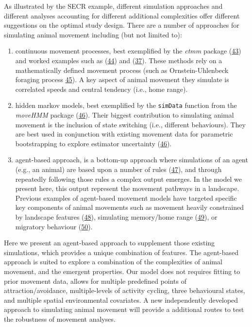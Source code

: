 \documentclass[10pt,a4paper]{article}
\begin{document}
As illustrated by the SECR example, different simulation approaches and different analyses accounting for different additional complexities offer different suggestions on the optimal study design.
There are a number of approaches for simulating animal movement including (but not limited to):

\begin{enumerate}
\def\labelenumi{\arabic{enumi}.}
\item
  continuous movement processes, best exemplified by the \emph{ctmm} package (\protect\hyperlink{ref-Calabrese2016}{43}) and worked examples such as (\protect\hyperlink{ref-silva_autocorrelationinformed_2022}{44}) and (\protect\hyperlink{ref-theng_confronting_2022}{37}).
  These methods rely on a mathematically defined movement process (such as Ornstein-Uhlenbeck foraging process \protect\hyperlink{ref-Fleming2014}{45}).
  A key aspect of animal movement they simulate is correlated speeds and central tendency (i.e., home range).
\item
  hidden markov models, best exemplified by the \texttt{simData} function from the \emph{moveHMM} package (\protect\hyperlink{ref-Michelot2016}{46}).
  Their biggest contribution to simulating animal movement is the inclusion of state switching (i.e., different behaviours).
  They are best used in conjunction with existing movement data for parametric bootstrapping to explore estimator uncertainty (\protect\hyperlink{ref-Michelot2016}{46}).
\item
  agent-based approach, is a bottom-up approach where simulations of an agent (e.g., an animal) are based upon a number of rules (\protect\hyperlink{ref-Tang2010}{47}), and through repeatedly following those rules a complex output emerges.
  In the model we present here, this output represent the movement pathways in a landscape.
  Previous examples of agent-based movement models have targeted specific key components of animal movements such as movement heavily constrained by landscape features (\protect\hyperlink{ref-quaglietta_simriv_2019}{48}), simulating memory/home range (\protect\hyperlink{ref-VanMoorter2009}{49}), or migratory behaviour (\protect\hyperlink{ref-bennett_modelling_2006}{50}).
\end{enumerate}

Here we present an agent-based approach to supplement those existing simulations, which provides a unique combination of features.
The agent-based approach is suited to explore a combination of the complexities of animal movement, and the emergent properties.
Our model does not requires fitting to prior movement data, allows for multiple predefined points of attraction/avoidance, multiple-levels of activity cycling, three behavioural states, and multiple spatial environmental covariates.
A new independently developed approach to simulating animal movement will provide a additional routes to test the robustness of movement analyses.
\end{document}
